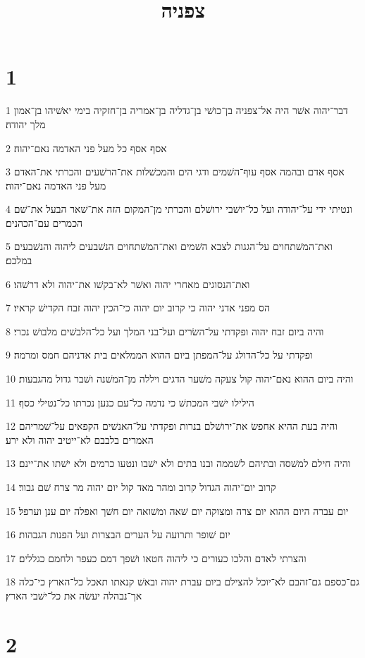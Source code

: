 

\title{צפניה}


\chapter{1}

\par 1 דבר־יהוה אשׁר היה אל־צפניה בן־כושׁי בן־גדליה בן־אמריה בן־חזקיה בימי יאשׁיהו בן־אמון מלך יהודה׃
\par 2 אסף אסף כל מעל פני האדמה נאם־יהוה׃
\par 3 אסף אדם ובהמה אסף עוף־השׁמים ודגי הים והמכשׁלות את־הרשׁעים והכרתי את־האדם מעל פני האדמה נאם־יהוה׃
\par 4 ונטיתי ידי על־יהודה ועל כל־יושׁבי ירושׁלם והכרתי מן־המקום הזה את־שׁאר הבעל את־שׁם הכמרים עם־הכהנים׃
\par 5 ואת־המשׁתחוים על־הגגות לצבא השׁמים ואת־המשׁתחוים הנשׁבעים ליהוה והנשׁבעים במלכם׃
\par 6 ואת־הנסוגים מאחרי יהוה ואשׁר לא־בקשׁו את־יהוה ולא דרשׁהו׃
\par 7 הס מפני אדני יהוה כי קרוב יום יהוה כי־הכין יהוה זבח הקדישׁ קראיו׃
\par 8 והיה ביום זבח יהוה ופקדתי על־השׂרים ועל־בני המלך ועל כל־הלבשׁים מלבושׁ נכרי׃
\par 9 ופקדתי על כל־הדולג על־המפתן ביום ההוא הממלאים בית אדניהם חמס ומרמה׃
\par 10 והיה ביום ההוא נאם־יהוה קול צעקה משׁער הדגים ויללה מן־המשׁנה ושׁבר גדול מהגבעות׃
\par 11 הילילו ישׁבי המכתשׁ כי נדמה כל־עם כנען נכרתו כל־נטילי כסף׃
\par 12 והיה בעת ההיא אחפשׂ את־ירושׁלם בנרות ופקדתי על־האנשׁים הקפאים על־שׁמריהם האמרים בלבבם לא־ייטיב יהוה ולא ירע׃
\par 13 והיה חילם למשׁסה ובתיהם לשׁממה ובנו בתים ולא ישׁבו ונטעו כרמים ולא ישׁתו את־יינם׃
\par 14 קרוב יום־יהוה הגדול קרוב ומהר מאד קול יום יהוה מר צרח שׁם גבור׃
\par 15 יום עברה היום ההוא יום צרה ומצוקה יום שׁאה ומשׁואה יום חשׁך ואפלה יום ענן וערפל׃
\par 16 יום שׁופר ותרועה על הערים הבצרות ועל הפנות הגבהות׃
\par 17 והצרתי לאדם והלכו כעורים כי ליהוה חטאו ושׁפך דמם כעפר ולחמם כגללים׃
\par 18 גם־כספם גם־זהבם לא־יוכל להצילם ביום עברת יהוה ובאשׁ קנאתו תאכל כל־הארץ כי־כלה אך־נבהלה יעשׂה את כל־ישׁבי הארץ׃

\chapter{2}

